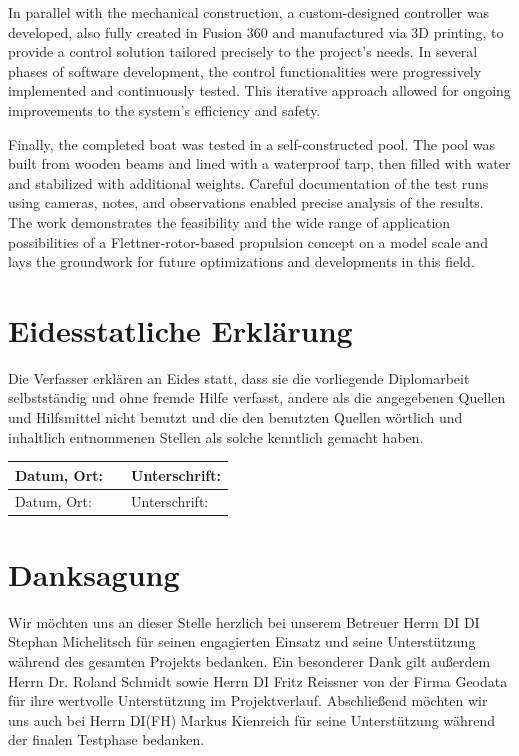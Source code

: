 \documentclass[a4paper,12pt]{article}
\begin{document}
In parallel with the mechanical construction, a custom-designed controller was developed, also fully created in Fusion 360 and manufactured via 3D printing, to provide a control solution tailored precisely to the project's needs. In several phases of software development, the control functionalities were progressively implemented and continuously tested. This iterative approach allowed for ongoing improvements to the system’s efficiency and safety.\newline

Finally, the completed boat was tested in a self-constructed pool. The pool was built from wooden beams and lined with a waterproof tarp, then filled with water and stabilized with additional weights. Careful documentation of the test runs using cameras, notes, and observations enabled precise analysis of the results. The work demonstrates the feasibility and the wide range of application possibilities of a Flettner-rotor-based propulsion concept on a model scale and lays the groundwork for future optimizations and developments in this field.

\newpage

\section*{Eidesstatliche Erklärung}
\label{sec:EidesstatlicheErklärung}

Die Verfasser erklären an Eides statt, dass sie die vorliegende Diplomarbeit selbstständig und ohne fremde Hilfe verfasst, andere als die angegebenen Quellen und Hilfsmittel nicht benutzt und die den benutzten Quellen wörtlich und inhaltlich entnommenen Stellen als solche kenntlich gemacht haben.\newline


\renewcommand{\arraystretch}{3} %
\begin{tabular}{|p{7.25cm}|p{0.5cm}|p{7.25cm}|}
    \hline
    Datum, Ort: & & Unterschrift: \\ \hline
    Datum, Ort: & & Unterschrift: \\ \hline
\end{tabular}

\newpage

\section*{Danksagung}
\label{sec:Danksagung}

Wir möchten uns an dieser Stelle herzlich bei unserem Betreuer Herrn DI DI Stephan Michelitsch für seinen engagierten Einsatz und seine Unterstützung während des gesamten Projekts bedanken.
Ein besonderer Dank gilt außerdem Herrn Dr. Roland Schmidt sowie Herrn DI Fritz Reissner von der Firma Geodata für ihre wertvolle Unterstützung im Projektverlauf.
Abschließend möchten wir uns auch bei Herrn DI(FH) Markus Kienreich für seine Unterstützung während der finalen Testphase bedanken.
\end{document}
